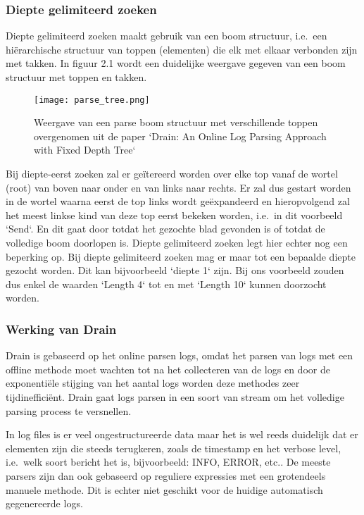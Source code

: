 \subsubsection{Diepte gelimiteerd zoeken}
Diepte gelimiteerd zoeken maakt gebruik van een boom structuur, i.e.\ een hiërarchische structuur van toppen (elementen) die elk met elkaar verbonden zijn met takken. In figuur 2.1 wordt een duidelijke weergave gegeven van een boom structuur met toppen en takken.

\begin{figure}[!htp]
    \texttt{[image: parse\_tree.png]}
    \caption{Weergave van een parse boom structuur met verschillende toppen overgenomen uit de paper `Drain: An Online Log Parsing Approach with Fixed Depth Tree`~\autocite{he2017drain}}
\end{figure}

Bij diepte-eerst zoeken zal er geïtereerd worden over elke top vanaf de wortel (root) van boven naar onder en van links naar rechts. Er zal dus gestart worden in de wortel waarna eerst de top links wordt geëxpandeerd en hieropvolgend zal het meest linkse kind van deze top eerst bekeken worden, i.e.\ in dit voorbeeld `Send`. En dit gaat door totdat het gezochte blad gevonden is of totdat de volledige boom doorlopen is. Diepte gelimiteerd zoeken legt hier echter nog een beperking op. Bij diepte gelimiteerd zoeken mag er maar tot een bepaalde diepte gezocht worden. Dit kan bijvoorbeeld `diepte 1` zijn. Bij ons voorbeeld zouden dus enkel de waarden `Length 4` tot en met `Length 10` kunnen doorzocht worden. 

\subsubsection{Werking van Drain}
Drain is gebaseerd op het online parsen logs, omdat het parsen van logs met een offline methode moet wachten tot na het collecteren van de logs en door de exponentiële stijging van het aantal logs worden deze methodes zeer tijdinefficiënt. Drain gaat logs parsen in een soort van stream om het volledige parsing process te versnellen. 

In log files is er veel ongestructureerde data maar het is wel reeds duidelijk dat er elementen zijn die steeds terugkeren, zoals de timestamp en het verbose level, i.e.\ welk soort bericht het is, bijvoorbeeld: INFO, ERROR, etc.. De meeste parsers zijn dan ook gebaseerd op reguliere expressies met een grotendeels manuele methode. Dit is echter niet geschikt voor de huidige automatisch gegenereerde logs. 

